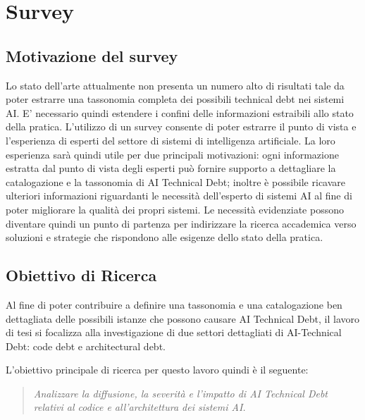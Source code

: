 \section{Survey}
\subsection{Motivazione del survey}

Lo stato dell'arte attualmente non presenta un numero alto di risultati tale da poter estrarre una tassonomia completa dei possibili technical debt nei sistemi AI. 
E' necessario quindi estendere i confini delle informazioni estraibili allo stato della pratica.
L'utilizzo di un survey consente di poter estrarre il punto di vista e l'esperienza di esperti del settore di sistemi di intelligenza artificiale.
La loro esperienza sarà quindi utile per due principali motivazioni: ogni informazione estratta dal punto di vista degli esperti può fornire supporto a dettagliare la catalogazione e la tassonomia di AI Technical Debt; inoltre è possibile ricavare ulteriori informazioni riguardanti le necessità dell'esperto di sistemi AI al fine di poter migliorare la qualità dei propri sistemi. Le necessità evidenziate possono diventare quindi un punto di partenza per indirizzare la ricerca accademica verso soluzioni e strategie che rispondono alle esigenze dello stato della pratica.

\subsection{Obiettivo di Ricerca}
Al fine di poter contribuire a definire una tassonomia e una catalogazione ben dettagliata delle possibili istanze che possono causare AI Technical Debt, il lavoro di tesi si focalizza alla investigazione di due settori dettagliati di AI-Technical Debt: code debt e architectural debt.

L'obiettivo principale di ricerca per questo lavoro quindi è il seguente:
\begin{quote}
    \textit{Analizzare la diffusione, la severità e l'impatto di AI Technical Debt relativi al codice e all'architettura dei sistemi AI.}
\end{quote}

